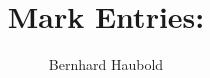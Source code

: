 \documentclass[a4paper]{report}
\begin{document}
\pagestyle{noweb}

\title{Mark  Entries: }
\author{Bernhard Haubold}
\maketitle




\end{document}
